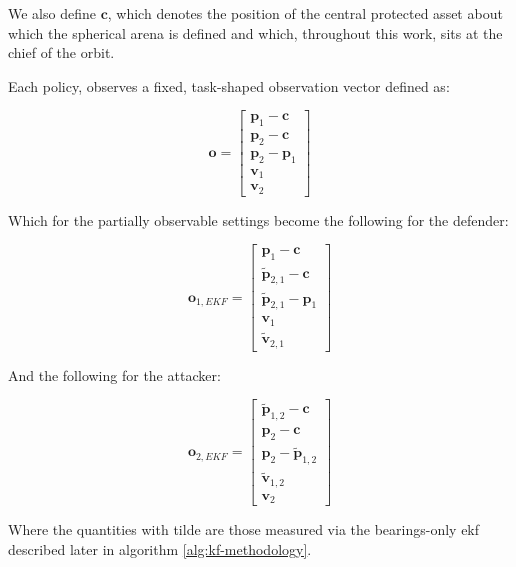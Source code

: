 We also define $\mathbf{c}$, which denotes the position of the central protected asset about which the spherical arena is defined and which, throughout this work, sits at the chief of the orbit.

Each policy, observes a fixed, task-shaped observation vector defined as:

\begin{equation}
\label{eq:Full_Obs_Both_Agents}
\boxed{
\mathbf{o} =
\begin{bmatrix}
\mathbf{p}_1-\mathbf{c}\\
\mathbf{p}_2-\mathbf{c}\\
\mathbf{p}_2-\mathbf{p}_1\\
\mathbf{v}_1\\
\mathbf{v}_2
\end{bmatrix}
}
\end{equation}



Which for the partially observable settings become the following for the defender:

\begin{equation}
\label{eq:EKF_Obs_Agent_1}
\boxed{
\mathbf{o}_{1,EKF} =
\begin{bmatrix}
\mathbf{p}_1-\mathbf{c}\\
\tilde{\mathbf{p}}_{2,1}-\mathbf{c}\\
\tilde{\mathbf{p}}_{2,1}-\mathbf{p}_1\\
\mathbf{v}_1\\
\tilde{\mathbf{v}}_{2,1}
\end{bmatrix}
}
\end{equation}

And the following for the attacker:

\begin{equation}
\label{eq:EKF_Obs_Agent_2}
\boxed{
\mathbf{o}_{2,EKF} =
\begin{bmatrix}
\tilde{\mathbf{p}}_{1,2}-\mathbf{c}\\
\mathbf{p}_2-\mathbf{c}\\
\mathbf{p}_2-\tilde{\mathbf{p}}_{1,2}\\
\tilde{\mathbf{v}}_{1,2}\\
\mathbf{v}_2
\end{bmatrix}
}
\end{equation}

Where the quantities with tilde are those measured via the bearings-only \acs{ekf} described later in algorithm \ref{alg:kf-methodology}. 

